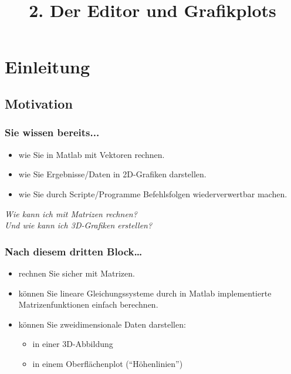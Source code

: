 

\title{\\{\scriptsize 2. Der Editor und Grafikplots}}


\setcounter{mchapter}{3}
\setcounter{mexercise}{0}


  

    \section{Einleitung}

    \subsection{Motivation}
    \begin{frame}
        \frametitle{Sie wissen bereits...}
        \begin{itemize}
            \item wie Sie in Matlab mit Vektoren rechnen.
            \item wie Sie Ergebnisse/Daten in 2D-Grafiken darstellen.
            \item wie Sie durch Scripte/Programme Befehlsfolgen wiederverwertbar machen.
        \end{itemize}

        \textit{Wie kann ich mit Matrizen rechnen?} \\
        \textit{Und wie kann ich 3D-Grafiken erstellen?}
    \end{frame}

    \begin{frame}
        \frametitle{Nach diesem dritten Block…}
        \begin{itemize}
            \item rechnen Sie sicher mit Matrizen.
            \item können Sie lineare Gleichungssysteme durch in Matlab implementierte Matrizenfunktionen einfach berechnen.
            \item können Sie zweidimensionale Daten darstellen:
            \begin{itemize}
                \item in einer 3D-Abbildung
                \item in einem Oberflächenplot (``Höhenlinien'')
            \end{itemize}
        \end{itemize}
    \end{frame}

